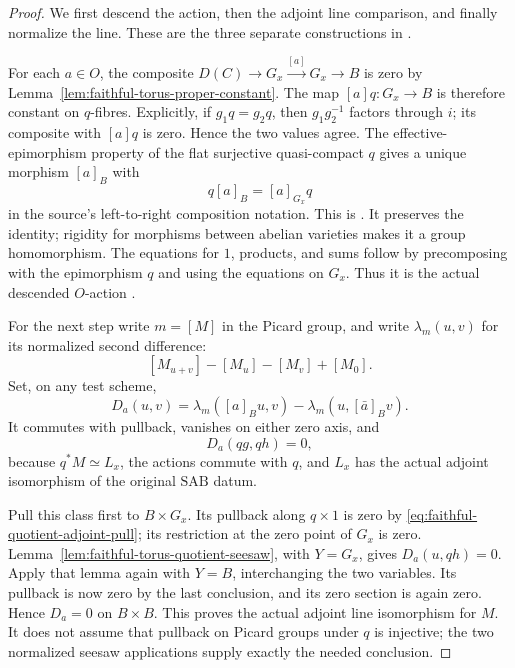 \begin{proof}
We first descend the action, then the adjoint line comparison,
and finally normalize the line.  These are the three separate
constructions in .

For each \(a\in O\), the composite
\(D(C)\to G_x\stackrel{[a]}\longrightarrow G_x\to B\)
is zero by Lemma~\ref{lem:faithful-torus-proper-constant}.
The map \([a]q:G_x\to B\) is therefore constant on \(q\)-fibres.
Explicitly, if \(g_1q=g_2q\), then
\(g_1g_2^{-1}\) factors through \(i\); its composite with
\([a]q\) is zero.  Hence the two values agree.
The effective-epimorphism property of the flat surjective
quasi-compact \(q\) gives a unique morphism \([a]_B\) with
\[
                         q[a]_B=[a]_{G_x}q
\]
in the source's left-to-right composition notation.
This is .
It preserves the identity; rigidity for morphisms between
abelian varieties makes it a group homomorphism.
The equations for \(1\), products, and sums follow by
precomposing with the epimorphism \(q\) and using the equations
on \(G_x\).  Thus it is the actual descended \(O\)-action
.

For the next step write \(m=[M]\) in the Picard group, and
write \(\lambda_m(u,v)\) for its normalized second difference:
\[
 [M_{u+v}]-[M_u]-[M_v]+[M_0].
\]
Set, on any test scheme,
\[
 D_a(u,v)=\lambda_m([a]_B u,v)
                   -\lambda_m(u,[\bar a]_Bv).
\]
It commutes with pullback, vanishes on either zero axis, and
\[
                         D_a(qg,qh)=0,
 \tag{AQ2}\label{eq:faithful-quotient-adjoint-pull}
\]
because \(q^*M\simeq L_x\), the actions commute with \(q\), and
\(L_x\) has the actual adjoint isomorphism of the original
\(\mathrm{SAB}\) datum.

Pull this class first to \(B\times G_x\).
Its pullback along \(q\times1\) is zero by
\eqref{eq:faithful-quotient-adjoint-pull}; its restriction at
the zero point of \(G_x\) is zero.
Lemma~\ref{lem:faithful-torus-quotient-seesaw}, with \(Y=G_x\),
gives \(D_a(u,qh)=0\).
Apply that lemma again with \(Y=B\), interchanging the two
variables.  Its pullback is now zero by the last conclusion,
and its zero section is again zero.  Hence \(D_a=0\) on
\(B\times B\).
This proves the actual adjoint line isomorphism for \(M\).
It does not assume that pullback on Picard groups under \(q\)
is injective; the two normalized seesaw applications supply
exactly the needed conclusion.


\end{proof}
